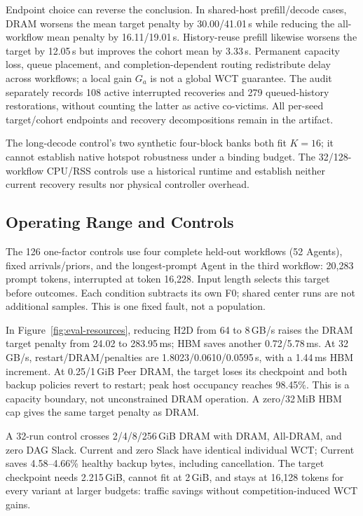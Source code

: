 Endpoint choice can reverse the conclusion. In shared-host prefill/decode
cases, DRAM worsens the mean target penalty by 30.00/41.01\,s while reducing
the all-workflow mean penalty by 16.11/19.01\,s. History-reuse prefill likewise
worsens the target by 12.05\,s but improves the cohort mean by 3.33\,s.
Permanent capacity loss, queue placement, and completion-dependent routing
redistribute delay across workflows; a local gain $G_a$ is not a global WCT
guarantee. The audit separately records 108 active interrupted recoveries and
279 queued-history restorations, without counting the latter as active
co-victims. All per-seed target/cohort endpoints and recovery decompositions
remain in the artifact.

The long-decode control's two synthetic four-block banks both fit $K=16$;
it cannot establish native hotspot robustness under a binding budget.
The 32/128-workflow CPU/RSS controls use a historical runtime and establish
neither current recovery results nor physical controller overhead.

\subsection{Operating Range and Controls}
\label{sec:eval-sensitivity}
The 126 one-factor controls use four complete held-out workflows (52 Agents),
fixed arrivals/priors, and the longest-prompt Agent in the third workflow:
20,283 prompt tokens, interrupted at token 16,228. Input length selects this
target before outcomes. Each condition subtracts its own F0; shared center
runs are not additional samples. This is one fixed fault, not a population.

In Figure~\ref{fig:eval-resources}, reducing H2D from 64 to 8\,GB/s raises the
DRAM target penalty from 24.02 to 283.95\,ms; HBM saves another 0.72/5.78\,ms.
At 32\,GB/s, restart/DRAM/\system penalties are 1.8023/0.0610/0.0595\,s,
with a 1.44\,ms HBM increment. At 0.25/1\,GiB Peer DRAM, the target loses its
checkpoint and both backup policies revert to restart; peak host occupancy
reaches 98.45\%. This is a capacity boundary, not unconstrained DRAM operation.
A zero/32\,MiB HBM cap gives the same target penalty as DRAM.

A 32-run control crosses 2/4/8/256\,GiB DRAM with DRAM, All-DRAM,
\system and zero DAG Slack. Current and zero Slack have identical individual
WCT; Current saves 4.58--4.66\% healthy backup bytes, including cancellation.
The target checkpoint needs 2.215\,GiB, cannot fit at 2\,GiB, and stays at
16,128 tokens for every variant at larger budgets: traffic savings without
competition-induced WCT gains.

